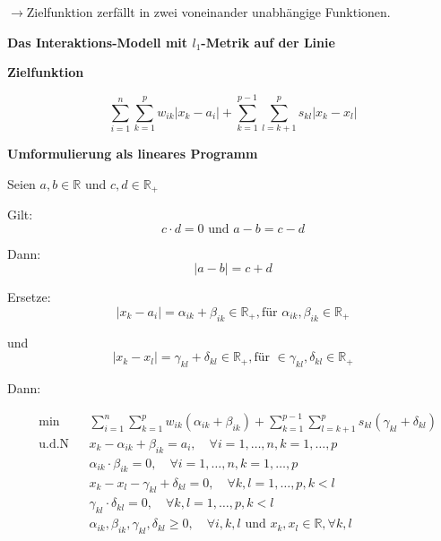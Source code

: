         $\rightarrow$Zielfunktion zerfällt in zwei voneinander unabhängige Funktionen.

        \par \textbf{Das Interaktions-Modell mit $l_1$-Metrik auf der Linie}

        \par \textbf{Zielfunktion}

        \begin{equation}
          \sum_{i=1}^{n}\sum_{k=1}^{p}w_{ik}|x_{k}-a_{i}| + \sum_{k=1}^{p-1}\sum_{l=k+1}^{p}s_{kl}|x_{k}-x_{l}|
        \end{equation}

        \par \textbf{Umformulierung als lineares Programm}

        \begin{framed}
          \par Seien $a, b \in \mathbb{R}$ und $c, d \in \mathbb{R}_+$\\
          \par Gilt: 
          \[c \cdot d = 0 \text{ und } a - b = c - d\]
          \par Dann:
          \[|a - b| = c + d\]
          \par Ersetze:
          \[|x_k - a_i| = \alpha_{ik} + \beta_{ik} \in \mathbb{R}_+, \text{für } \alpha_{ik}, \beta_{ik} \in \mathbb{R}_+\]
          \par und 
          \[|x_k - x_l| = \gamma_{kl} + \delta_{kl} \in \mathbb{R}_+, \text{für } \in \gamma_{kl}, \delta_{kl} \in \mathbb{R}_+\]
        \end{framed}

        \par Dann:

        \begin{equation}
          \begin{aligned}
            & \underset{}{\text{min}}
            && \sum_{i=1}^{n}\sum_{k=1}^{p}w_{ik}(\alpha_{ik} + \beta_{ik}) + \sum_{k=1}^{p-1}\sum_{l=k+1}^{p}s_{kl}(\gamma_{kl} + \delta_{kl})\\
            & \text{u.d.N}
            & & x_k - \alpha_{ik} + \beta_{ik} = a_i, \quad \forall i = 1, \dots, n, k = 1, \dots, p\\ 
            & & & \alpha_{ik} \cdot \beta_{ik} = 0, \quad \forall i = 1, \dots, n, k = 1, \dots, p\\ 
            & & & x_k - x_l - \gamma_{kl}+ \delta_{kl} = 0, \quad \forall k, l = 1, \dots, p, k < l \\
            & & & \gamma_{kl} \cdot \delta_{kl} = 0, \quad \forall k, l = 1, \dots, p, k < l \\
            & & & \alpha_{ik}, \beta_{ik}, \gamma_{kl}, \delta_{kl} \geq 0, \quad \forall i, k, l \text{ und } x_k, x_l \in \mathbb{R}, \forall k,l
          \end{aligned}
        \end{equation}

